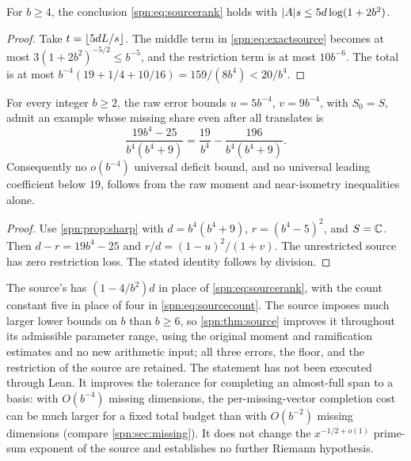 \begin{corollary}\label{spn:cor:five}
For $b\ge4$, the conclusion \eqref{spn:eq:sourcerank} holds with
$\lvert A\rvert s\le5d\log(1+2b^2)$.
\end{corollary}

\begin{proof}
Take $t=\lfloor5dL/s\rfloor$. The middle term in \eqref{spn:eq:exactsource} becomes
at most $3(1+2b^2)^{-5/2}\le b^{-5}$, and the restriction term is at most
$10b^{-6}$. The total is at most
$b^{-4}(19+1/4+10/16)=159/(8b^4)<20/b^4$.
\end{proof}

\begin{proposition}\label{spn:prop:fourth}
For every integer $b\ge2$, the raw error bounds $u=5b^{-4}$, $v=9b^{-4}$, with
$S_0=S$, admit an example whose missing share even after all translates is
\[
 \frac{19b^4-25}{b^4(b^4+9)}=\frac{19}{b^4}-\frac{196}{b^4(b^4+9)}.
\]
Consequently no $o(b^{-4})$ universal deficit bound, and no universal leading
coefficient below $19$, follows from the raw moment and near-isometry
inequalities alone.
\end{proposition}

\begin{proof}
Use \cref{spn:prop:sharp} with $d=b^4(b^4+9)$, $r=(b^4-5)^2$, and $S=\mathbb{C}$. Then
$d-r=19b^4-25$ and $r/d=(1-u)^2/(1+v)$. The unrestricted source has zero
restriction loss. The stated identity follows by division.
\end{proof}

\begin{remark}\label{spn:rem:source-status}
The source's  has $(1-4/b^2)d$ in place of
\eqref{spn:eq:sourcerank}, with the count constant five in place of four in
\eqref{spn:eq:sourcecount}. The source imposes much larger lower bounds on $b$
than $b\ge6$, so \cref{spn:thm:source} improves it throughout its admissible
parameter range, using the original moment and ramification estimates and no
new arithmetic input; all three errors, the floor, and the restriction of the
source are retained. The statement has not been executed through Lean. It
improves the tolerance for completing an almost-full span to a basis: with
$O(b^{-4})$ missing dimensions, the per-missing-vector completion cost can be
much larger for a fixed total budget than with $O(b^{-2})$ missing dimensions
(compare \cref{spn:sec:missing}). It does not change the $x^{-1/2+o(1)}$
prime-sum exponent of the source and establishes no further Riemann
hypothesis.
\end{remark}

